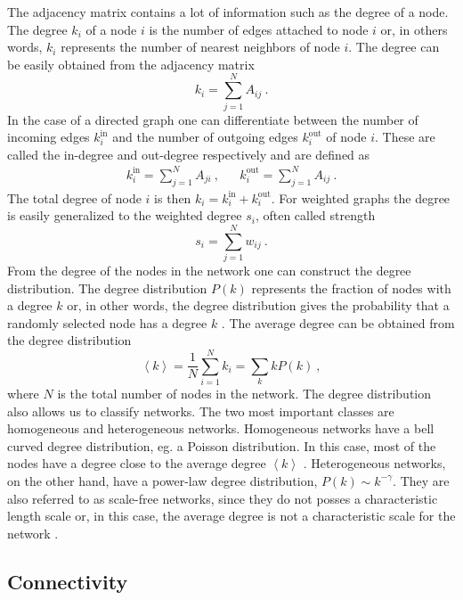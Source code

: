 \documentclass[11 pt , letterpaper , twoside , openright]{book}
\begin{document}
The adjacency matrix contains a lot of information such as the degree of a node. The degree $k_i$ of a node $i$ is the number of edges attached to node $i$ or, in others words, $k_i$ represents the number of nearest neighbors of node $i$. The degree can be easily obtained from the adjacency matrix \cite{Mata2020}
\begin{equation}
	k_i = \sum_{j=1}^N A_{ij}\ .
\end{equation}
In the case of a directed graph one can differentiate between the number of incoming edges $k_i^{\textrm{in}}$ and the number of outgoing edges $k_i^{\textrm{out}}$ of node $i$. These are called the in-degree and out-degree respectively and are defined as \cite{Mata2020}
\begin{align}
	k_i^{\text{in}} = \sum_{j=1}^N A_{ji} \ , && k_i^{\text{out}} = \sum_{j=1}^N A_{ij} \ .
\end{align}
The total degree of node $i$ is then $k_i = k_i^{\text{in}} + k_i^{\text{out}}$. For weighted graphs the degree is easily generalized to the weighted degree $s_i$, often called strength \cite{Ioannis2007}
\begin{equation}
	s_i = \sum_{j=1}^N w_{ij} \ .
\end{equation}
From the degree of the nodes in the network one can construct the degree distribution. The degree distribution $P(k)$ represents the fraction of nodes with a degree $k$ or, in other words, the degree distribution gives the probability that a randomly selected node has a degree $k$ \cite{Newman2003}. The average degree can be obtained from the degree distribution \cite{Mata2020}
\begin{equation}
	\left<k\right> = \frac{1}{N} \sum_{i=1}^N k_i = \sum_k k P(k) \ ,
\end{equation}
where $N$ is the total number of nodes in the network. The degree distribution also allows us to classify networks. The two most important classes are homogeneous and heterogeneous networks. Homogeneous networks have a bell curved degree distribution, eg. a Poisson distribution. In this case, most of the nodes have a degree close to the average degree $\left<k\right>$ \cite{Barabasi2016}. Heterogeneous networks, on the other hand, have a power-law degree distribution, $P(k) \sim k^{-\gamma}$. They are also referred to as scale-free networks, since they do not posses a characteristic length scale or, in this case, the average degree is not a characteristic scale for the network \cite{Barabasi2016}\cite{Mata2020}.

\subsection{Connectivity}
\end{document}
